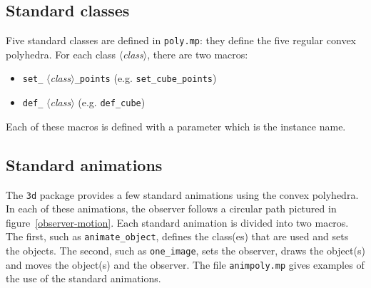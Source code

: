 \documentclass[nonumber,harvardcite]{ltugboat}
\DeclareRobustCommand\meta[1]{%
       \ensuremath{\langle}\emph{#1}\ensuremath{\rangle}}
\begin{document}
\subsection{Standard classes}

Five standard classes are defined in \texttt{poly.mp}:
they define the five regular convex polyhedra. For each class \meta{class},
there are two macros:

\begin{itemize}

\item \verb|set_|\meta{class}\verb|_points|  
      (e.g. \verb|set_cube_points|)

\item \verb|def_|\meta{class} (e.g. \verb|def_cube|)

\end{itemize}

Each of these macros is defined with a parameter which is the instance
name.

\subsection{Standard animations}

The \texttt{3d} package provides a few standard animations using
the convex polyhedra. In each of these animations, the observer
follows a circular path pictured in figure~\ref{observer-motion}.
Each standard animation is divided into two macros. The first,
such as \verb|animate_object|, defines the class(es) that are used
and sets the objects. The second, such as \verb|one_image|, sets
the observer, draws the object(s) and moves the object(s) and the
observer. The file \verb|animpoly.mp| gives examples of the use
of the standard animations.

\end{document}
